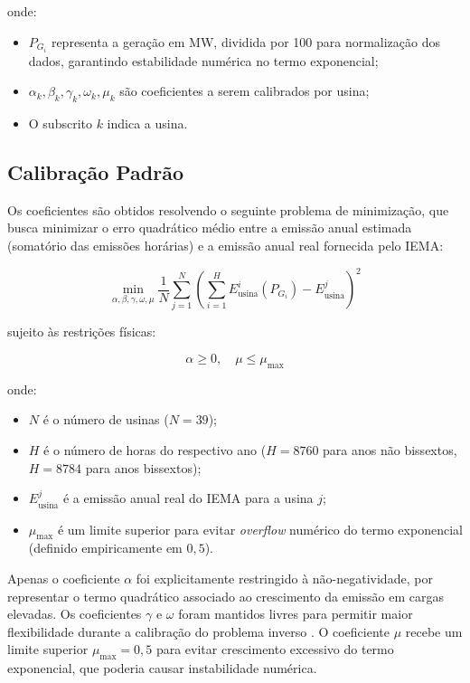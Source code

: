 onde:
\begin{itemize}
    \item \(P_{G_i}\) representa a geração em MW, dividida por 100 para normalização dos dados, garantindo estabilidade numérica no termo exponencial;
    \item \(\alpha_k, \beta_k, \gamma_k, \omega_k, \mu_k\) são coeficientes a serem calibrados por usina;
    \item O subscrito \(k\) indica a usina.
\end{itemize}

\subsection{Calibração Padrão}

Os coeficientes são obtidos resolvendo o seguinte problema de minimização, que busca minimizar o erro quadrático médio entre a emissão anual estimada (somatório das emissões horárias) e a emissão anual real fornecida pelo \ac{IEMA}:

\begin{equation}
\min_{\alpha,\beta,\gamma,\omega,\mu} \frac{1}{N} \sum_{j=1}^{N} \left( \sum_{i=1}^{H} E_{\text{usina}}^{i}(P_{G_i}) - E_{\text{usina}}^{j} \right)^2
\label{eq:minimizacao_padrao}
\end{equation}

sujeito às restrições físicas:

\begin{equation}
\alpha \geq 0, \quad \mu \leq \mu_{\max}
\label{eq:restricoes_fisicas}
\end{equation}

onde:
\begin{itemize}
    \item \(N\) é o número de usinas (\(N = 39\));
    \item \(H\) é o número de horas do respectivo ano (\(H = 8760\) para anos não bissextos, \(H = 8784\) para anos bissextos);
    \item \(E_{\text{usina}}^{j}\) é a emissão anual real do \ac{IEMA} para a usina \(j\);
    \item \(\mu_{\max}\) é um limite superior para evitar \textit{overflow} numérico do termo exponencial (definido empiricamente em \(0,5\)).
\end{itemize}

Apenas o coeficiente \(\alpha\) foi explicitamente restringido à não-negatividade, por representar o termo quadrático associado ao crescimento da emissão em cargas elevadas. Os coeficientes \(\gamma\) e \(\omega\) foram mantidos livres para permitir maior flexibilidade durante a calibração do problema inverso \cite{wood2013power}. O coeficiente \(\mu\) recebe um limite superior \(\mu_{\max} = 0,5\) para evitar crescimento excessivo do termo exponencial, que poderia causar instabilidade numérica.

